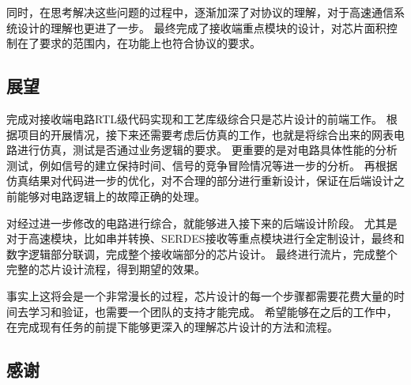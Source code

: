 \documentclass[UTF8]{ctexart}
\begin{document}
同时，在思考解决这些问题的过程中，逐渐加深了对协议的理解，对于高速通信系统设计的理解也更进了一步。
最终完成了接收端重点模块的设计，对芯片面积控制在了要求的范围内，在功能上也符合协议的要求。

\subsection{展望}

完成对接收端电路RTL级代码实现和工艺库级综合只是芯片设计的前端工作。
根据项目的开展情况，接下来还需要考虑后仿真的工作，也就是将综合出来的网表电路进行仿真，测试是否通过业务逻辑的要求。
更重要的是对电路具体性能的分析测试，例如信号的建立保持时间、信号的竞争冒险情况等进一步的分析。
再根据仿真结果对代码进一步的优化，对不合理的部分进行重新设计，保证在后端设计之前能够对电路逻辑上的故障正确的处理。

对经过进一步修改的电路进行综合，就能够进入接下来的后端设计阶段。
尤其是对于高速模块，比如串并转换、SERDES接收等重点模块进行全定制设计，最终和数字逻辑部分联调，完成整个接收端部分的芯片设计。
最终进行流片，完成整个完整的芯片设计流程，得到期望的效果。

事实上这将会是一个非常漫长的过程，芯片设计的每一个步骤都需要花费大量的时间去学习和验证，也需要一个团队的支持才能完成。
希望能够在之后的工作中，在完成现有任务的前提下能够更深入的理解芯片设计的方法和流程。

\subsection{感谢}




\end{document}
